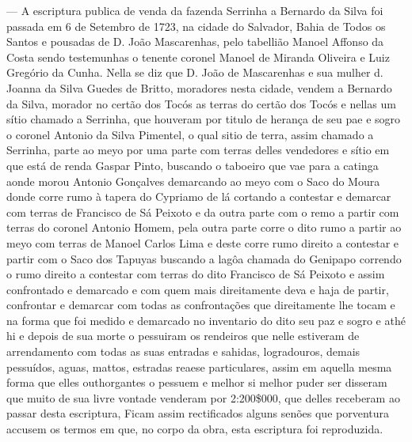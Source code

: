 — A escriptura publica de venda da fazenda Serrinha a Bernardo da Silva foi passada em 6 de Setembro de 1723, na cidade do Salvador, Bahia de Todos os Santos e pousadas de D. João Mascarenhas, pelo tabellião Manoel Affonso da Costa sendo testemunhas o tenente coronel Manoel de Miranda Oliveira e Luiz Gregório da Cunha. Nella se diz que D. João de Mascarenhas e sua mulher d. Joanna da Silva Guedes de Britto, moradores nesta cidade, vendem a Bernardo da Silva, morador no certão dos Tocós as terras do certão dos Tocós e nellas um sítio chamado a Serrinha, que houveram por
titulo de herança de seu pae e sogro o coronel Antonio da Silva Pimentel, o qual sitio de terra, assim chamado a Serrinha, parte ao meyo por uma parte com terras delles vendedores e sítio em que está de renda Gaspar Pinto, buscando o taboeiro que vae para a catinga aonde morou Antonio Gonçalves demarcando ao meyo com o Saco do Moura donde corre rumo à tapera do Cypriamo de lá cortando a contestar e demarcar com terras de Francisco de Sá Peixoto e da outra parte com o remo a partir com terras do coronel Antonio Homem, pela outra parte corre o dito rumo a partir ao meyo com terras de Manoel Carlos Lima e deste corre rumo direito a contestar e partir com o Saco dos Tapuyas buscando a lagôa chamada do Genipapo correndo o rumo direito a contestar com terras do dito Francisco de Sá Peixoto e assim confrontado e demarcado e com quem mais direitamente deva e haja de partir, confrontar e demarcar com todas as confrontações que direitamente lhe tocam e na forma que foi medido e demarcado no inventario do dito seu paz e sogro e athé hi e depois de sua morte o pessuiram os rendeiros que nelle estiveram de arrendamento com todas as suas entradas e sahidas, logradouros, demais pessuídos, aguas, mattos, estradas reaese particulares, assim em aquella mesma forma que elles outhorgantes o pessuem e melhor si melhor puder ser disseram que muito de sua livre vontade venderam por 2:200\$000, que delles receberam ao passar desta escriptura, Ficam assim rectificados alguns senões que porventura accusem os termos em que, no corpo da obra, esta escriptura foi reproduzida.



